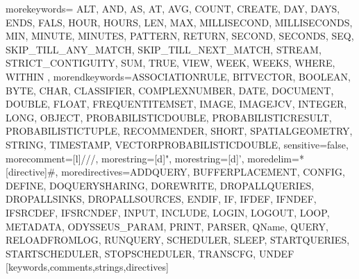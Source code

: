    {morekeywords={%
ALT, AND, AS, AT, AVG, COUNT, CREATE, DAY, DAYS, ENDS, FALS, HOUR, HOURS, LEN, MAX, MILLISECOND, MILLISECONDS, MIN, MINUTE, MINUTES, PATTERN, RETURN, SECOND, SECONDS, SEQ, SKIP_TILL_ANY_MATCH, SKIP_TILL_NEXT_MATCH, STREAM, STRICT_CONTIGUITY, SUM, TRUE, VIEW, WEEK, WEEKS, WHERE, WITHIN%
      },%
   morendkeywords={ASSOCIATIONRULE, BITVECTOR, BOOLEAN, BYTE, CHAR, CLASSIFIER, COMPLEXNUMBER, DATE, DOCUMENT, DOUBLE, FLOAT, FREQUENTITEMSET, IMAGE, IMAGEJCV, INTEGER, LONG, OBJECT, PROBABILISTICDOUBLE, PROBABILISTICRESULT, PROBABILISTICTUPLE, RECOMMENDER, SHORT, SPATIALGEOMETRY, STRING, TIMESTAMP, VECTORPROBABILISTICDOUBLE},%
   sensitive=false,
   morecomment=[l]///,%
   morestring=[d]",%
   morestring=[d]',%
   moredelim=*[directive]\#,%
   moredirectives={ADDQUERY, BUFFERPLACEMENT, CONFIG, DEFINE, DOQUERYSHARING, DOREWRITE, DROPALLQUERIES, DROPALLSINKS, DROPALLSOURCES, ENDIF, IF, IFDEF, IFNDEF, IFSRCDEF, IFSRCNDEF, INPUT, INCLUDE, LOGIN, LOGOUT, LOOP, METADATA, ODYSSEUS_PARAM, PRINT, PARSER, QName, QUERY, RELOADFROMLOG, RUNQUERY, SCHEDULER, SLEEP, STARTQUERIES, STARTSCHEDULER, STOPSCHEDULER, TRANSCFG, UNDEF}%
}[keywords,comments,strings,directives]

